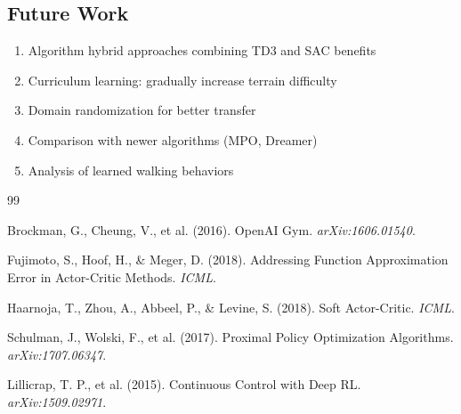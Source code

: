 \documentclass[10pt,a4paper,twocolumn]{article}
\begin{document}
\subsection{Future Work}

\begin{enumerate}
    \item Algorithm hybrid approaches combining TD3 and SAC benefits
    \item Curriculum learning: gradually increase terrain difficulty
    \item Domain randomization for better transfer
    \item Comparison with newer algorithms (MPO, Dreamer)
    \item Analysis of learned walking behaviors
\end{enumerate}

\begin{thebibliography}{99}

Brockman, G., Cheung, V., et al. (2016). OpenAI Gym. \textit{arXiv:1606.01540}.

Fujimoto, S., Hoof, H., \& Meger, D. (2018). Addressing Function Approximation Error in Actor-Critic Methods. \textit{ICML}.

Haarnoja, T., Zhou, A., Abbeel, P., \& Levine, S. (2018). Soft Actor-Critic. \textit{ICML}.

Schulman, J., Wolski, F., et al. (2017). Proximal Policy Optimization Algorithms. \textit{arXiv:1707.06347}.

Lillicrap, T. P., et al. (2015). Continuous Control with Deep RL. \textit{arXiv:1509.02971}.

\end{thebibliography}
\end{document}
